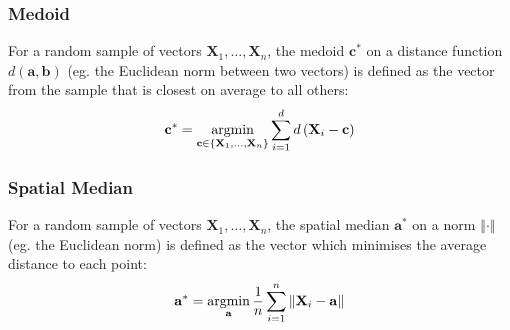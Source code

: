 \documentclass[11pt]{report} %
\begin{document}
\subsubsection{Medoid}

For a random sample of vectors $\mathbf{X}_{1}, \dots, \mathbf{X}_{n}$, the medoid $\mathbf{c}^{*}$ on a distance function $d\left(\mathbf{a}, \mathbf{b}\right)$ (eg. the Euclidean norm between two vectors) is defined as the vector from the sample that is closest on average to all others:
\begin{equation}
\mathbf{c}^{*} = \operatorname*{argmin}_{\mathbf{c} \in \left\{\mathbf{X}_{1}, \dots, \mathbf{X}_{n}\right\}}\sum_{i = 1}^{d}d\left(\mathbf{X}_{i} - \mathbf{c}\right)
\end{equation}

\subsubsection{Spatial Median}

For a random sample of vectors $\mathbf{X}_{1}, \dots, \mathbf{X}_{n}$, the spatial median $\mathbf{a}^{*}$ on a norm $\left\Vert\cdot\right\Vert$ (eg. the Euclidean norm) is defined as the vector which minimises the average distance to each point:
\begin{equation}
\mathbf{a}^{*} = \operatorname*{argmin}_{\mathbf{a}} \dfrac{1}{n}\sum_{i = 1}^{n}\left\Vert \mathbf{X}_{i} - \mathbf{a}\right\Vert
\end{equation}
\end{document}
